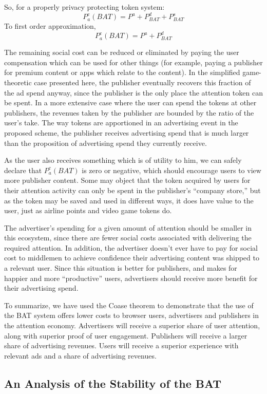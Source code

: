 \documentclass[11pt]{article}
\begin{document}
So, for a properly privacy protecting token system: 
  \[P^{c}_a(BAT) = P^{a} + P^{d}_{BAT} + P^{s}_{BAT}\]
  To first order approximation,  
  \[P^{c}_a(BAT) = P^{a} + P^{d}_{BAT} \]

The remaining social cost can be reduced or eliminated by paying the
user compensation which can be used for other things (for example,
paying a publisher for premium content or apps which relate to the
content). In the simplified game-theoretic case presented here, the
publisher eventually recovers this fraction of the ad spend anyway,
since the publisher is the only place the attention token can be
spent. In a more extensive case where the user can spend the tokens at
other publishers, the revenues taken by the publisher are bounded by
the ratio of the user's take. The way tokens are apportioned in an
advertising event in the proposed scheme, the publisher receives
advertising spend that is much larger than the proposition of
advertising spend they currently receive.

As the user also receives something which is of utility to him, we can
safely declare that $P^{c}_a(BAT)$ is zero or negative, which should encourage users
to view more publisher content. Some may object that the token
acquired by users for their attention activity can only be spent in
the publisher's ``company store,'' but as the token may be saved and
used in different ways, it does have value to the user, just as
airline points and video game tokens do.

The advertiser's spending for a given amount of attention should be
smaller in this ecosystem, since there are fewer social costs
associated with delivering the required attention. In addition, the
advertiser doesn't ever have to pay for social cost to middlemen to
achieve confidence their advertising content was shipped to a relevant
user. Since this situation is better for publishers, and makes for
happier and more ``productive'' users, advertisers should receive more
benefit for their advertising spend.

To summarize, we have used the Coase theorem to demonstrate that the
use of the BAT system offers lower costs to browser users, advertisers
and publishers in the attention economy. Advertisers will receive a
superior share of user attention, along with superior proof of user
engagement. Publishers will receive a larger share of advertising
revenues. Users will receive a superior experience with relevant ads
and a share of advertising revenues.


\subsection{An Analysis of the Stability of the BAT}
\label{sec-8-3}
\end{document}
